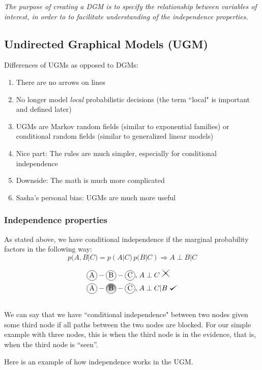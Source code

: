 \documentclass{article}
\def\checkmark{\tikz\fill[scale=0.4](0,.35) -- (.25,0) -- (1,.7) -- (.25,.15) -- cycle;}
\def\crossmark{\tikz\fill[scale=0.4](0.01,0) -- (0,0.01) -- (.45,.5) -- (0,0.99) -- (0.01,1) -- (.5,.55) -- (0.99,1) -- (1,0.99) -- (0.55,0.5) -- (1,0.01) -- (0.99,0) -- (0.5,0.45) -- cycle;}
\newcommand\encirc[1]{%
  \tikz[baseline=(X.base)] 
    \node (X) [draw, shape=circle, inner sep=0] {\strut #1};}
\newcommand\encircshaded[1]{%
  \tikz[baseline=(X.base)] 
    \node (X) [draw, shape=circle, inner sep=0, shade] {\strut #1};}
\begin{document}
\emph{The purpose of creating a DGM is to specify the relationship between variables of interest, in order to to facilitate understanding of the independence properties.}

\subsection{Undirected Graphical Models (UGM)}

Differences of UGMs as opposed to DGMs:
\begin{enumerate}
	\item There are no arrows on lines
	\item No longer model \emph{local} probabilistic decisions (the term ``local" is important and defined later)
	\item UGMs are Markov random fields (similar to exponential families) or conditional random fields (similar to 		generalized linear models)
	\item Nice part: The rules are much simpler, especially for conditional independence
	\item Downside: The math is much more complicated
	\item Sasha's personal bias: UGMs are much more useful
\end{enumerate}


\subsubsection{Independence properties}

As stated above, we have conditional independence if the marginal probability factors in the following way:
\begin{equation}
p(A,B|C) = p(A|C) \, p(B|C) \Rightarrow A \perp B | C
\end{equation}

\begin{align}
\encirc{A} - \encirc{B} - \encirc{C}, \; &A \perp C \; \crossmark \\
\encirc{A} - \encircshaded{B} - \encirc{C}, \; &A \perp C|B \; \checkmark \\
\smallskip
\end{align}
We can say that we have ``conditional independence" between two nodes given some third node if all paths between the two nodes are blocked. For our simple example with three nodes, this is when the third node is in the evidence, that is, when the third node is ``seen''.
\smallskip

Here is an example of how independence works in the UGM.
\begin{center}
\end{center}
\end{document}
